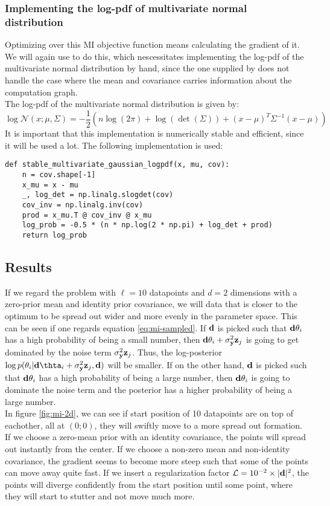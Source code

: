 \subsubsection{Implementing the log-pdf of multivariate normal distribution}
Optimizing over this MI objective function means calculating the gradient of it. 
We will again use  to do this, which nescessitates implementing the log-pdf of the multivariate normal distribution by hand, 
since the one supplied by  does not handle the case where the mean and covariance carries information about the computation graph.\\
The log-pdf of the multivariate normal distribution is given by:
\begin{equation}
  \log \mathcal{N}(x; \mu, \Sigma) = -\frac{1}{2}(n\log(2\pi) + \log(\det(\Sigma)) + (x - \mu)^T\Sigma^{-1}(x - \mu))
\end{equation}
It is important that this implementation is numerically stable and efficient, since it will be used a lot.
The following implementation is used:
\begin{verbatim}
def stable_multivariate_gaussian_logpdf(x, mu, cov):
    n = cov.shape[-1]
    x_mu = x - mu
    _, log_det = np.linalg.slogdet(cov)
    cov_inv = np.linalg.inv(cov)
    prod = x_mu.T @ cov_inv @ x_mu
    log_prob = -0.5 * (n * np.log(2 * np.pi) + log_det + prod)
    return log_prob
\end{verbatim}
\subsection{Results}
If we regard the problem with $\ell = 10$ datapoints and $d=2$ dimensions with a zero-prior mean and identity prior covariance, 
we will data that is closer to the optimum to be spread out wider and more evenly in the parameter space.
This can be seen if one regards equation \ref{eq:mi-sampled}. 
If $\mathbf{d}$ is picked such that $\mathbf{d}\theta_i$ has a high probability of being a small number, then
$\mathbf{d}\theta_i + \sigma^2_{\mathbf{y}}\mathbf{z}_j$ is going to get dominated by the noise term $\sigma^2_{\mathbf{y}}\mathbf{z}_j$.
Thus, the log-posterior $\log p(\theta_i | \B{d}\thta_i + \sigma^2_\B{y}\B{z}_j, \B{d})$ will be smaller.
If on the other hand, $\mathbf{d}$ is picked such that $\mathbf{d}\theta_i$ has a high probability of being a large number, then $\mathbf{d}\theta_i$ is going to dominate the noise term
and the posterior has a higher probability of being a large number.\\
In figure \ref{fig:mi-2d}, we can see if start position of 10 datapoints are on top of eachother, all at $(0;0)$, they will swiftly move to a more spread out formation.\\
If we choose a zero-mean prior with an identity covariance, the points will spread out instantly from the center. If we choose a non-zero mean and non-identity covariance, 
the gradient seems to become more steep such that some of the points can move away quite fast.
If we insert a regularization factor $\mathcal{L} = 10^{-2}\times |\mathbf{d}|^2$, the points will diverge confidently from the start position until some point, where they will start to stutter and not move much more.

